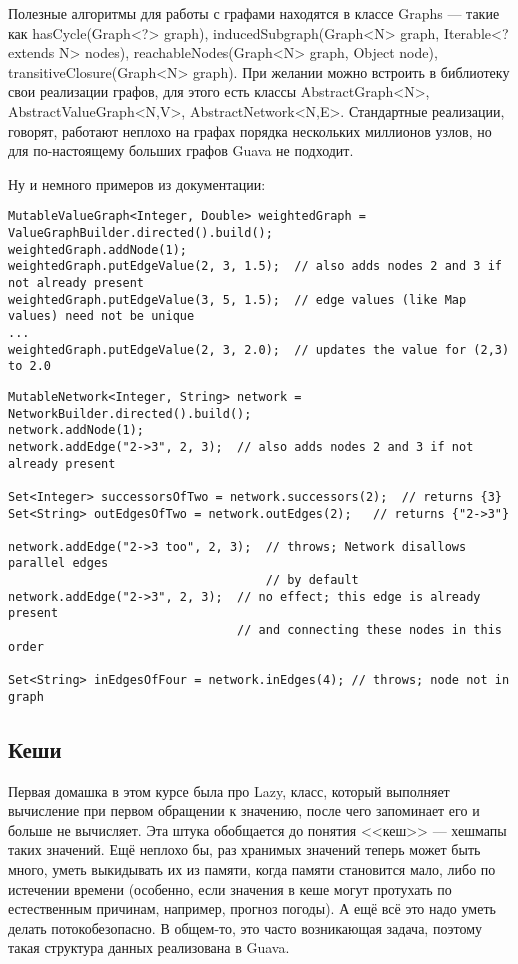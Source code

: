 \documentclass[a5paper,draft]{article}
\begin{document}
Полезные алгоритмы для работы с графами находятся в классе Graphs --- такие как hasCycle(Graph<?> graph), inducedSubgraph(Graph<N> graph, Iterable<? extends N> nodes), reachableNodes(Graph<N> graph, Object node), transitiveClosure(Graph<N> graph). При желании можно встроить в библиотеку свои реализации графов, для этого есть классы AbstractGraph<N>, AbstractValueGraph<N,V>, AbstractNetwork<N,E>. Стандартные реализации, говорят, работают неплохо на графах порядка нескольких миллионов узлов, но для по-настоящему больших графов Guava не подходит.

Ну и немного примеров из документации:

\begin{verbatim}
MutableValueGraph<Integer, Double> weightedGraph = ValueGraphBuilder.directed().build();
weightedGraph.addNode(1);
weightedGraph.putEdgeValue(2, 3, 1.5);  // also adds nodes 2 and 3 if not already present
weightedGraph.putEdgeValue(3, 5, 1.5);  // edge values (like Map values) need not be unique
...
weightedGraph.putEdgeValue(2, 3, 2.0);  // updates the value for (2,3) to 2.0
\end{verbatim}

\begin{verbatim}
MutableNetwork<Integer, String> network = NetworkBuilder.directed().build();
network.addNode(1);
network.addEdge("2->3", 2, 3);  // also adds nodes 2 and 3 if not already present

Set<Integer> successorsOfTwo = network.successors(2);  // returns {3}
Set<String> outEdgesOfTwo = network.outEdges(2);   // returns {"2->3"}

network.addEdge("2->3 too", 2, 3);  // throws; Network disallows parallel edges
                                    // by default
network.addEdge("2->3", 2, 3);  // no effect; this edge is already present
                                // and connecting these nodes in this order

Set<String> inEdgesOfFour = network.inEdges(4); // throws; node not in graph
\end{verbatim}

\subsection{Кеши}

Первая домашка в этом курсе была про Lazy, класс, который выполняет вычисление при первом обращении к значению, после чего запоминает его и больше не вычисляет. Эта штука обобщается до понятия <<кеш>> --- хешмапы таких значений. Ещё неплохо бы, раз хранимых значений теперь может быть много, уметь выкидывать их из памяти, когда памяти становится мало, либо по истечении времени (особенно, если значения в кеше могут протухать по естественным причинам, например, прогноз погоды). А ещё всё это надо уметь делать потокобезопасно. В общем-то, это часто возникающая задача, поэтому такая структура данных реализована в Guava.
\end{document}

